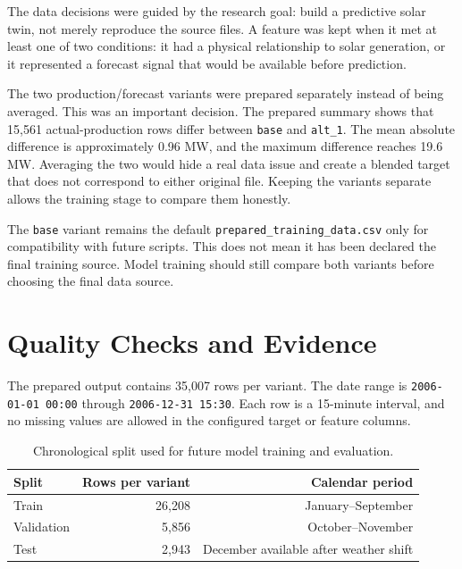 \documentclass[paper=a4, fontsize=11pt]{scrartcl}
\numberwithin{table}{section}
\begin{document}
The data decisions were guided by the research goal: build a predictive solar
twin, not merely reproduce the source files. A feature was kept when it met at
least one of two conditions: it had a physical relationship to solar generation,
or it represented a forecast signal that would be available before prediction.

The two production/forecast variants were prepared separately instead of being
averaged. This was an important decision. The prepared summary shows that
15,561 actual-production rows differ between \texttt{base} and \texttt{alt\_1}.
The mean absolute difference is approximately 0.96 MW, and the maximum
difference reaches 19.6 MW. Averaging the two would hide a real data issue and
create a blended target that does not correspond to either original file. Keeping
the variants separate allows the training stage to compare them honestly.

The \texttt{base} variant remains the default \texttt{prepared\_training\_data.csv}
only for compatibility with future scripts. This does not mean it has been
declared the final training source. Model training should still compare both
variants before choosing the final data source.

\section{Quality Checks and Evidence}

The prepared output contains 35,007 rows per variant. The date range is
\texttt{2006-01-01 00:00} through \texttt{2006-12-31 15:30}. Each row is a
15-minute interval, and no missing values are allowed in the configured target
or feature columns.

\begin{table}[h]
\centering
\begin{tabular}{lrr}
\toprule
\textbf{Split} & \textbf{Rows per variant} & \textbf{Calendar period} \\
\midrule
Train & 26,208 & January--September \\
Validation & 5,856 & October--November \\
Test & 2,943 & December available after weather shift \\
\bottomrule
\end{tabular}
\caption{Chronological split used for future model training and evaluation.}
\end{table}
\end{document}
